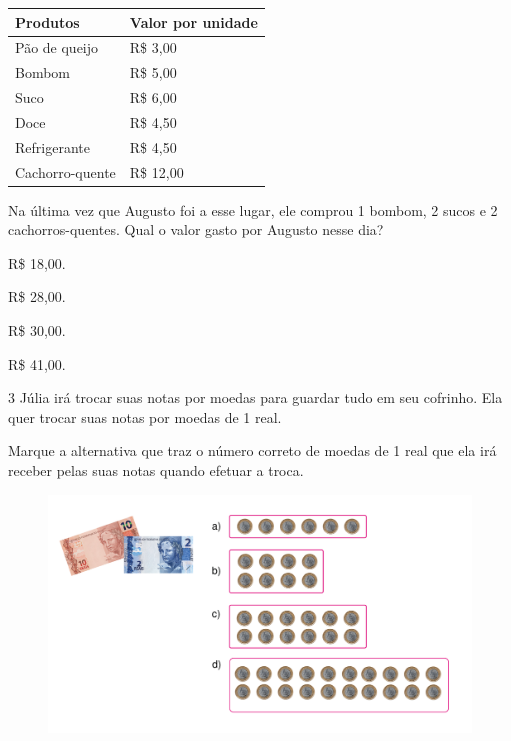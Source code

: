 \begin{longtable}[]{@{}ll@{}}
\toprule
\hline
\textbf{Produtos} & \textbf{Valor por unidade}\tabularnewline
\hline
\midrule
\endhead
Pão de queijo & R\$ 3,00\tabularnewline
\hline
Bombom & R\$ 5,00\tabularnewline
\hline
Suco & R\$ 6,00\tabularnewline
\hline
Doce & R\$ 4,50\tabularnewline
\hline
Refrigerante & R\$ 4,50\tabularnewline
\hline
Cachorro-quente & R\$ 12,00\tabularnewline
\bottomrule
\end{longtable}

Na última vez que Augusto foi a esse lugar, ele comprou 1 bombom, 2
sucos e 2 cachorros-quentes. Qual o valor gasto por Augusto nesse dia?

\begin{escolha}

\item
  R\$ 18,00.
\item
  R\$ 28,00.
\item
  R\$ 30,00.
\item
  R\$ 41,00.
\end{escolha}

\num{3} Júlia irá trocar suas notas por moedas para guardar tudo em seu
cofrinho. Ela quer trocar suas notas por moedas de 1 real.

Marque a
alternativa que traz o número correto de moedas de 1 real que ela
irá receber pelas suas notas quando efetuar a troca.

\begin{figure}[htpb!]
\centering
\includegraphics[width=\textwidth]{./media/image74.png}
\end{figure}

